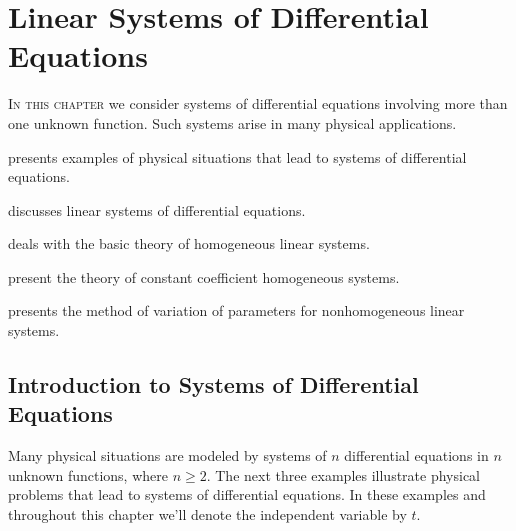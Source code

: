 
\chapter{Linear Systems of Differential Equations}\label{ch:systems}

\noindent
\textsc{In this chapter} we consider
systems of differential equations
involving more than one unknown function. Such systems
arise in many physical applications.


\medskip\noindent
{} presents examples of physical situations
that lead to systems of differential equations.

\medskip\noindent
{} discusses
linear systems of differential equations.

\medskip\noindent
{} deals with the basic theory of homogeneous
linear systems.

\medskip\noindent
{}
present the theory of constant coefficient homogeneous systems.

\medskip\noindent
{} presents the method
of variation of parameters for nonhomogeneous linear systems.


\newpage

\section{Introduction to Systems of Differential Equations}
\label{sec:systems_intro}

Many physical situations are modeled by systems of $n$ differential
equations
in $n$ unknown functions, where $n\ge2$. The next three examples
illustrate physical problems that lead to systems of differential
equations. In these examples and throughout this chapter we'll
denote the independent variable by $t$.

